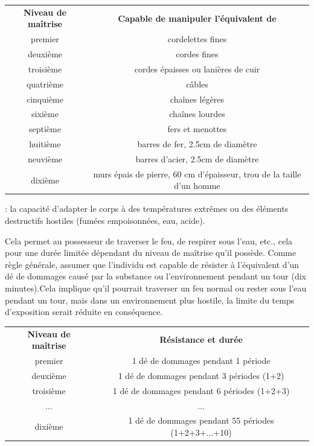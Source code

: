 \documentclass[11pt]{article}
\newcommand{\uline}[1]{\underline{\smash{#1}\vphantom{T}}\vphantom{#1}}
\begin{document}
{\bigskip

\begin{tabular}{cc}
\textbf{Niveau de maîtrise} & \textbf{Capable de manipuler l'équivalent de} \\
premier    & cordelettes fines \\
deuxième   & cordes fines \\
troisième  & cordes épaisses ou lanières de cuir\\
quatrième  & câbles \\
cinquième  & chaînes légères \\
sixième    & chaînes lourdes \\
septième   & fers et menottes\\
huitième   & barres de fer, 2.5cm de diamètre\\
neuvième   & barres d'acier, 2.5cm de diamètre \\
dixième    & murs épais de pierre, 60 cm d'épaisseur, trou de la taille d'un homme \\
\end{tabular}

\bigskip

\label{guerrier-controle-corps}\textbf{\uline{Contrôle du corps (5/tour)}} : la capacité d'adapter le corps à des températures extrêmes ou des éléments destructifs hostiles (fumées empoisonnées, eau, acide).

\bigskip

Cela permet au possesseur de traverser le feu, de respirer sous l'eau, etc., cela pour une durée limitée dépendant du niveau de maîtrise qu'il possède. Comme règle générale, assumer que l'individu est capable de résister à l'équivalent d'un dé de dommages causé par la substance ou l'environnement pendant un tour (dix minutes).Cela implique qu'il pourrait traverser un feu normal ou rester sous l'eau pendant un tour, mais dans un environnement plus hostile, la limite du temps d'exposition serait réduite en conséquence.

\bigskip

\begin{tabular}{cc}
\textbf{Niveau de maîtrise} & \textbf{Résistance et durée} \\
premier     & 1 dé de dommages pendant 1 période \\
deuxième    & 1 dé de dommages pendant 3 périodes (1+2) \\
troisième   & 1 dé de dommages pendant 6 périodes (1+2+3) \\
...         & ... \\
dixième     & 1 dé de dommages pendant 55 périodes (1+2+3+...+10) \\
\end{tabular}

}
\end{document}
